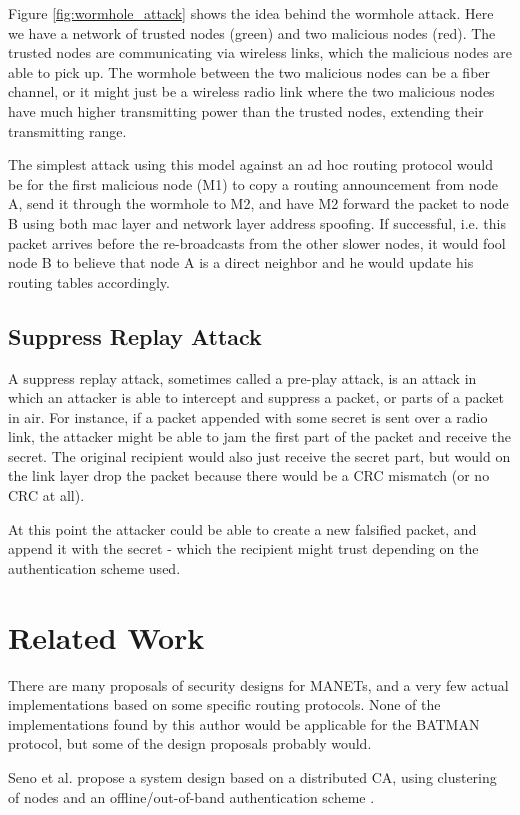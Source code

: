 Figure \ref{fig:wormhole_attack} shows the idea behind the wormhole attack. Here
we have a network of trusted nodes (green) and two malicious nodes (red). The
trusted nodes are communicating via wireless links, which the malicious nodes
are able to pick up. The wormhole between the two malicious nodes can be a fiber
channel, or it might just be a wireless radio link where the two malicious nodes
have much higher transmitting power than the trusted nodes, extending their
transmitting range.

The simplest attack using this model against an ad hoc routing protocol would be
for the first malicious node (M1) to copy a routing announcement from node A,
send it through the wormhole to M2, and have M2 forward the packet to node B
using both mac layer and network layer address spoofing. If successful, i.e.
this packet arrives before the re-broadcasts from the other slower nodes, it
would fool node B to believe that node A is a direct neighbor and he would
update his routing tables accordingly.

\subsection{Suppress Replay Attack}
A suppress replay attack, sometimes called a pre-play attack, is an attack in
which an attacker is able to intercept and suppress a packet, or parts of a
packet in air. For instance, if a packet appended with some secret is sent over
a radio link, the attacker might be able to jam the first part of the packet and
receive the secret. The original recipient would also just receive the secret
part, but would on the link layer drop the packet because there would be a
\ac{CRC} mismatch (or no \ac{CRC} at all).

At this point the attacker could be able to create a new falsified packet, and
append it with the secret - which the recipient might trust depending on the
authentication scheme used.

\section{Related Work}
There are many proposals of security designs for \acp{MANET}, and a very few
actual implementations based on some specific routing protocols. None of the
implementations found by this author would be applicable for the BATMAN
protocol, but some of the design proposals probably would.

Seno et al. propose a system design based on a distributed CA, using clustering
of nodes and an offline/out-of-band authentication scheme \cite{hosseinisecure}.

